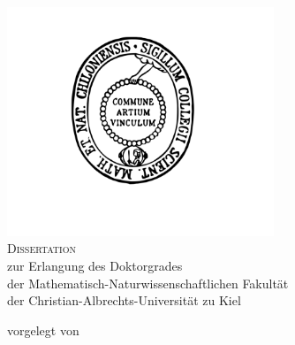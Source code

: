 \begin{titlepage}
\setlength{\hoffset}{0mm}
	\begin{addmargin}[-1cm]{-3cm}
    \begin{center}
        \large  

        \hfill

        \vfill

        \begingroup
            \hrulefill\\
            \vspace{.6cm}
            {\LARGE\myTitle} \\[0.3cm] 
	    	{\Large\mySubtitle} \\ 
        	\vspace{.1cm}
            \hrulefill\\
        \endgroup
	\vspace{1.5cm}
    \includegraphics[width=8cm]{images/coverimaqe.png} \\
	\vspace{1.2cm}
    {\Large\textsc{Dissertation}}\\
	\vspace{.6cm}
        \begingroup
	    zur Erlangung des Doktorgrades\\
	    der Mathematisch-Naturwissenschaftlichen Fakult\"at\\
	    der Christian-Albrechts-Universit\"at zu Kiel
	\vspace{1.2cm}
        \endgroup     

	{	    
        vorgelegt von\\[0.3cm]
        \Large\textcolor{Maroon}{\myName}
    }


\end{center}
\end{addmargin}
\end{titlepage}
